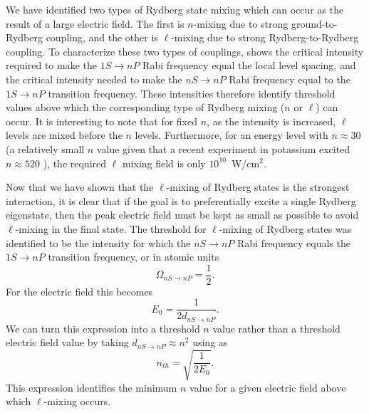 We have identified two types of Rydberg state mixing which can occur
as the result of a large electric field.  The first is  $n$-mixing due to
strong ground-to-Rydberg coupling, and the other is $\ell$-mixing due to
strong Rydberg-to-Rydberg coupling. To characterize these two types of
couplings,
 shows the critical intensity required to make the $1S
\rightarrow nP$ Rabi frequency equal the local level spacing, and the
critical intensity needed to make the $nS
\rightarrow nP$ Rabi frequency equal to the $1S \rightarrow nP$ transition
frequency.  These intensities therefore identify threshold values above which
the corresponding type of Rydberg mixing ($n$ or $\ell$) can occur.  It is
interesting to note that for fixed $n$, as the intensity is increased, $\ell$
levels are mixed before the $n$ levels.  Furthermore, for an energy level
with $n \approx 30$ (a relatively small $n$ value given that a recent
experiment in potassium excited $n \approx 520$ \cite{Frey:96}),
the required $\ell$ mixing field is only $10^{10}$~W/cm$^2$.

Now that we have shown that the $\ell$-mixing of Rydberg states is the
strongest interaction, it is clear that if the goal is to preferentially excite
a single Rydberg eigenstate, then the peak electric field must be kept as small
as possible to avoid $\ell$-mixing in the final state.   The threshold for
$\ell$-mixing of Rydberg states was identified to be the intensity for which the
$nS \rightarrow nP$ Rabi frequency equals the $1S \rightarrow nP$ transition
frequency, or in atomic units
\begin{equation}
\Omega_{nS \rightarrow nP} = \frac{1}{2}.
\label{mix}
\end{equation}
For the electric field this becomes
\begin{equation}
E_0 = \frac{1}{2 d_{nS \rightarrow nP}}.
\end{equation}
We can turn this expression into a threshold $n$ value rather than a threshold
electric field value by taking $d_{nS \rightarrow nP} \approx n^2$ using
 as
\begin{equation}
n_{th} = \sqrt{\frac{1}{2 E_0}}.
\label{nth}
\end{equation}
This expression identifies the minimum $n$ value for a given electric field
above which $\ell$-mixing occurs.


